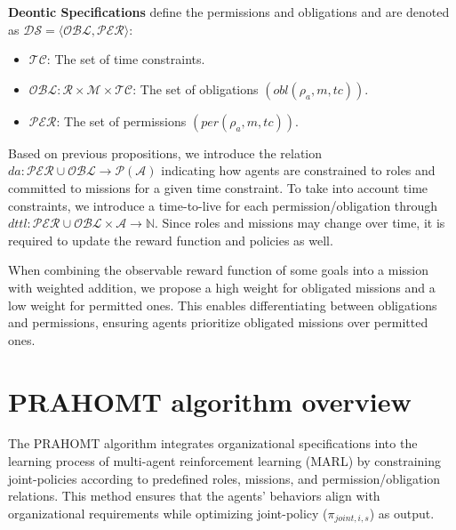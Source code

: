 \documentclass[conference]{IEEEtran}
\newcounter{relation}
\begin{document}
\textbf{Deontic Specifications} define the permissions and obligations and are denoted as $\mathcal{DS} = \langle \mathcal{OBL}, \mathcal{PER} \rangle$:

\begin{itemize}
    \item $\mathcal{TC}$: The set of time constraints.
    \item $\mathcal{OBL}: \mathcal{R} \times \mathcal{M} \times \mathcal{TC}$: The set of obligations $(obl(\rho_a, m, tc))$.
    \item $\mathcal{PER}$: The set of permissions $(per(\rho_a, m, tc))$.
\end{itemize}

Based on previous propositions, we introduce the relation $da: \mathcal{PER} \cup \mathcal{OBL} \rightarrow \mathcal{P}(\mathcal{A})$ indicating how agents are constrained to roles and committed to missions for a given time constraint. To take into account time constraints, we introduce a time-to-live for each permission/obligation through $dttl: \mathcal{PER} \cup \mathcal{OBL} \times \mathcal{A} \rightarrow \mathbb{N}$. Since roles and missions may change over time, it is required to update the reward function and policies as well.

When combining the observable reward function of some goals into a mission with weighted addition, we propose a high weight for obligated missions and a low weight for permitted ones. This enables differentiating between obligations and permissions, ensuring agents prioritize obligated missions over permitted ones.


\section{PRAHOMT algorithm overview}\label{sec:prahom_theory}



The PRAHOMT algorithm integrates organizational specifications into the learning process of multi-agent reinforcement learning (MARL) by constraining joint-policies according to predefined roles, missions, and permission/obligation relations. This method ensures that the agents' behaviors align with organizational requirements while optimizing joint-policy ($\pi_{joint,i,s}$) as output.
\end{document}
